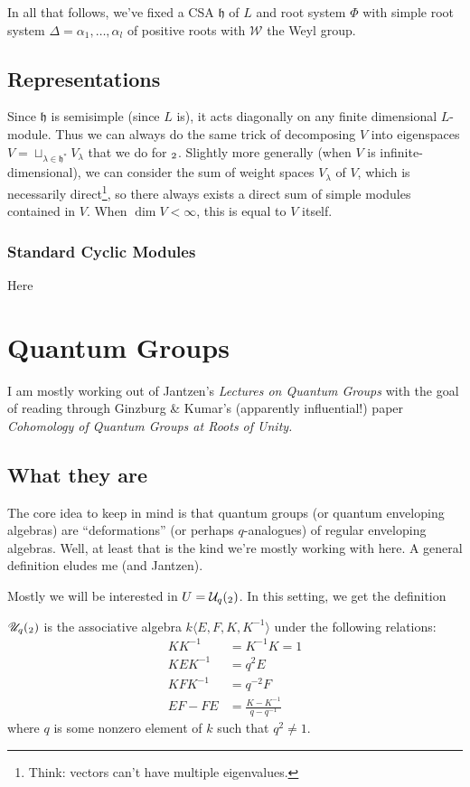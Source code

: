 \documentclass[12pt]{article}
\theoremstyle{nonumberbreak}
\theoremstyle{changebreak}
\theoremstyle{nonumberplain}
\theoremstyle{change}
\newcommand*{\h}{\mathfrak{h}}
\let\sl\relax
\newcommand*{\sl}{\mathfrak{sl}}
\begin{document}
In all that follows, we've fixed a CSA $\h$ of $L$ and root system $\Phi$ with simple root system $\Delta=\alpha_1,\dots,\alpha_l$
of positive roots with $\mathcal{W}$ the Weyl group.

\subsection{Representations}
Since $\h$ is semisimple (since $L$ is), it acts diagonally on any finite dimensional $L$-module. Thus we can always
do the same trick of decomposing $V$ into eigenspaces $V=\sqcup_{\lambda\in \h^*}V_\lambda$ that we do for $\sl_2$.
Slightly more generally (when $V$ is infinite-dimensional), we can consider the sum of weight spaces $V_\lambda$ of $V$, 
which is necessarily  direct\footnote{Think: vectors can't have multiple eigenvalues.}, so there always
exists a direct sum of simple modules contained in $V$. When $\dim V<\infty$, this is equal to $V$ itself.

\subsubsection{Standard Cyclic Modules}
Here

\newpage
\section{Quantum Groups}
I am mostly working out of Jantzen's \textit{Lectures on Quantum Groups} with the goal of reading through Ginzburg \& Kumar's
(apparently influential!) paper \textit{Cohomology of Quantum Groups at Roots of Unity.}

\subsection{What they are}
The core idea to keep in mind is that quantum groups (or quantum enveloping algebras) are ``deformations'' (or perhaps $q$-analogues) of
regular enveloping algebras. Well, at least that is the kind we're mostly working with here. A general definition eludes me (and Jantzen).

Mostly we will be interested in $U=\mathcal{U}_q(\sl_2)$. In this setting, we get the definition
\begin{defn}[Quantum Enveloping Algebra of $\sl_2$]
	$\mathscr{U}_q(\sl_2)$ is the associative algebra $k\langle E,F,K,K^{-1}\rangle$ under the following relations:
	\begin{align*}
		KK^{-1}&=K^{-1}K=1\tag{R1}\\
		KEK^{-1} &= q^2 E\tag{R2}\\
		KFK^{-1} &= q^{-2}F\tag{R3}\\
		EF-FE &= \frac{K-K^{-1}}{q-q^{-1}}\tag{R4}
	\end{align*}
	where $q$ is some nonzero element of $k$ such that $q^2\ne 1$.
\end{defn}
\end{document}
